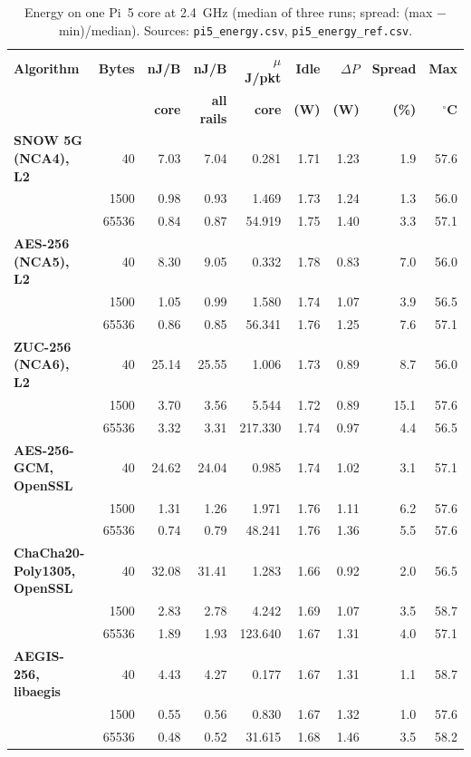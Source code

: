 \begin{table}[!htbp]
\centering
\caption{Energy on one Pi~5 core at 2.4~GHz (median of three runs; spread: (max $-$ min)/median). Sources: \texttt{pi5\_energy.csv}, \texttt{pi5\_energy\_ref.csv}.}
\label{tab:s-energy}
\footnotesize
\begin{tabular}{@{}>{\bfseries}l r r r r r r r r@{}}
\toprule
\textbf{Algorithm} & \textbf{Bytes} & \textbf{nJ/B} & \textbf{nJ/B} & \textbf{$\mu$J/pkt} & \textbf{Idle} & \textbf{$\Delta P$} & \textbf{Spread} & \textbf{Max} \\
& & \textbf{core} & \textbf{all rails} & \textbf{core} & \textbf{(W)} & \textbf{(W)} & \textbf{(\%)} & \textbf{$^\circ$C} \\
\midrule
SNOW 5G (NCA4), L2 & 40 & 7.03 & 7.04 & 0.281 & 1.71 & 1.23 & 1.9 & 57.6 \\
 & 1500 & 0.98 & 0.93 & 1.469 & 1.73 & 1.24 & 1.3 & 56.0 \\
 & 65536 & 0.84 & 0.87 & 54.919 & 1.75 & 1.40 & 3.3 & 57.1 \\
\addlinespace[2pt]
AES-256 (NCA5), L2 & 40 & 8.30 & 9.05 & 0.332 & 1.78 & 0.83 & 7.0 & 56.0 \\
 & 1500 & 1.05 & 0.99 & 1.580 & 1.74 & 1.07 & 3.9 & 56.5 \\
 & 65536 & 0.86 & 0.85 & 56.341 & 1.76 & 1.25 & 7.6 & 57.1 \\
\addlinespace[2pt]
ZUC-256 (NCA6), L2 & 40 & 25.14 & 25.55 & 1.006 & 1.73 & 0.89 & 8.7 & 56.0 \\
 & 1500 & 3.70 & 3.56 & 5.544 & 1.72 & 0.89 & 15.1 & 57.6 \\
 & 65536 & 3.32 & 3.31 & 217.330 & 1.74 & 0.97 & 4.4 & 56.5 \\
\addlinespace[2pt]
AES-256-GCM, OpenSSL & 40 & 24.62 & 24.04 & 0.985 & 1.74 & 1.02 & 3.1 & 57.1 \\
 & 1500 & 1.31 & 1.26 & 1.971 & 1.76 & 1.11 & 6.2 & 57.6 \\
 & 65536 & 0.74 & 0.79 & 48.241 & 1.76 & 1.36 & 5.5 & 57.6 \\
\addlinespace[2pt]
ChaCha20-Poly1305, OpenSSL & 40 & 32.08 & 31.41 & 1.283 & 1.66 & 0.92 & 2.0 & 56.5 \\
 & 1500 & 2.83 & 2.78 & 4.242 & 1.69 & 1.07 & 3.5 & 58.7 \\
 & 65536 & 1.89 & 1.93 & 123.640 & 1.67 & 1.31 & 4.0 & 57.1 \\
\addlinespace[2pt]
AEGIS-256, libaegis & 40 & 4.43 & 4.27 & 0.177 & 1.67 & 1.31 & 1.1 & 58.7 \\
 & 1500 & 0.55 & 0.56 & 0.830 & 1.67 & 1.32 & 1.0 & 57.6 \\
 & 65536 & 0.48 & 0.52 & 31.615 & 1.68 & 1.46 & 3.5 & 58.2 \\
\bottomrule
\end{tabular}
\end{table}
